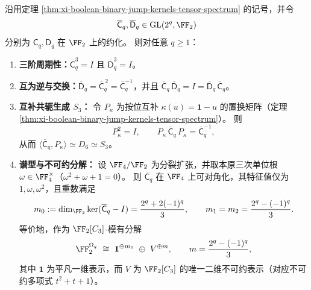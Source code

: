 \begin{theorem}\label{thm:xi-boolean-binary-jump-kernels-char2-s3}
沿用定理 \ref{thm:xi-boolean-binary-jump-kernels-tensor-spectrum} 的记号，并令
\[
\overline{\mathsf C}_q,\overline{\mathsf D}_q\in \mathrm{GL}(2^q,\FF_2)
\]
分别为 \(\mathsf C_q,\mathsf D_q\) 在 \(\FF_2\) 上的约化。
则对任意 \(q\ge 1\)：
\begin{enumerate}
\normalfont
  \item \textbf{三阶周期性：}\(\overline{\mathsf C}_q^3=I\) 且 \(\overline{\mathsf D}_q^3=I\)。
  \item \textbf{互为逆与交换：}\(\overline{\mathsf D}_q=\overline{\mathsf C}_q^{\,2}=\overline{\mathsf C}_q^{-1}\)，并且
  \(
  \overline{\mathsf C}_q\,\overline{\mathsf D}_q=I=\overline{\mathsf D}_q\,\overline{\mathsf C}_q
  \)。
  \item \textbf{互补共轭生成 \texorpdfstring{$S_3$}{S3}：}
  令 \(P_\kappa\) 为按位互补 \(\kappa(u)=\mathbf 1-u\) 的置换矩阵（定理 \ref{thm:xi-boolean-binary-jump-kernels-tensor-spectrum}）。
  则
  \[
  P_\kappa^2=I,\qquad
  P_\kappa\,\overline{\mathsf C}_q\,P_\kappa=\overline{\mathsf C}_q^{-1},
  \]
  从而
  \(
  \langle \overline{\mathsf C}_q,P_\kappa\rangle\simeq D_6\simeq S_3
  \)。
  \item \textbf{谱型与不可约分解：}
  设 \(\FF_4/\FF_2\) 为分裂扩张，并取本原三次单位根 \(\omega\in\FF_4^\times\)（\(\omega^2+\omega+1=0\)）。
  则 \(\overline{\mathsf C}_q\) 在 \(\FF_4\) 上可对角化，其特征值仅为 \(1,\omega,\omega^2\)，且重数满足
  \[
  m_0:=\dim_{\FF_2}\ker(\overline{\mathsf C}_q-I)=\frac{2^q+2(-1)^q}{3},
  \qquad
  m_1=m_2=\frac{2^q-(-1)^q}{3}.
  \]
  等价地，作为 \(\FF_2[C_3]\)-模有分解
  \[
  \FF_2^{\Omega_q}\ \cong\ \mathbf 1^{\oplus m_0}\ \oplus\ V^{\oplus m},
  \qquad
  m=\frac{2^q-(-1)^q}{3},
  \]
  其中 \(\mathbf 1\) 为平凡一维表示，而 \(V\) 为 \(\FF_2[C_3]\) 的唯一二维不可约表示（对应不可约多项式 \(t^2+t+1\)）。
\end{enumerate}
\end{theorem}

